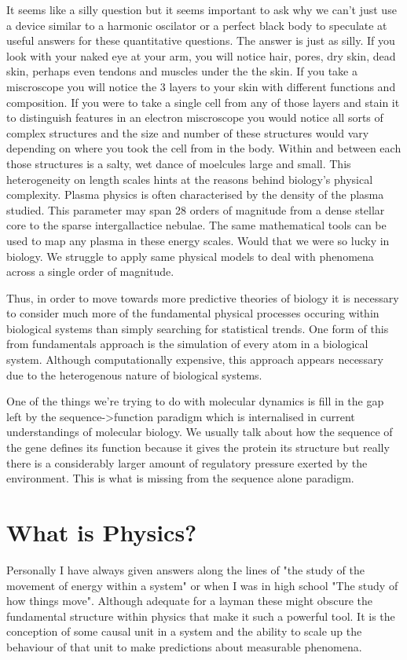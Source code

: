 It seems like a silly question but it seems important to ask why we can't just use a device similar to a harmonic oscilator or a perfect black body to speculate at useful answers for these quantitative questions. The answer is just as silly. If you look with your naked eye at your arm, you will notice hair, pores, dry skin, dead skin, perhaps even tendons and muscles under the the skin. If you take a miscroscope you will notice the 3 layers to your skin with different functions and composition. If you were to take a single cell from any of those layers and stain it to distinguish features in an electron miscroscope you would notice all sorts of complex structures and the size and number of these structures would vary depending on where you took the cell from in the body. Within and between each those structures is a salty, wet dance of moelcules large and small. This heterogeneity on length scales hints at the reasons behind biology's physical complexity. Plasma physics is often characterised by the density of the plasma studied. This parameter may span 28 orders of magnitude from a dense stellar core to the sparse intergallactice nebulae. The same mathematical tools can be used to map any plasma in these energy scales. Would that we were so lucky in biology. We struggle to apply same physical models to deal with phenomena across a single order of magnitude.  


Thus, in order to move towards more predictive theories of biology it is necessary to consider much more of the fundamental physical processes occuring within biological systems than simply searching for statistical trends. One form of this from fundamentals approach is the simulation of every atom in a biological system. Although computationally expensive, this approach appears necessary due to the heterogenous nature of biological systems. 

One of the things we're trying to do with molecular dynamics is fill in the gap left by the sequence->function paradigm which is internalised in current understandings of molecular biology. We usually talk about how the sequence of the gene defines its function because it gives the protein its structure but really there is a considerably larger amount of regulatory pressure exerted by the environment. This is what is missing from the sequence alone paradigm.

\section{What is Physics?}
Personally I have always given answers along the lines of "the study of the movement of energy within a system" or when I was in high school "The study of how things move". Although adequate for a layman these might obscure the fundamental structure within physics that make it such a powerful tool. It is the conception of some causal unit in a system and the ability to scale up the behaviour of that unit to make predictions about measurable phenomena.

